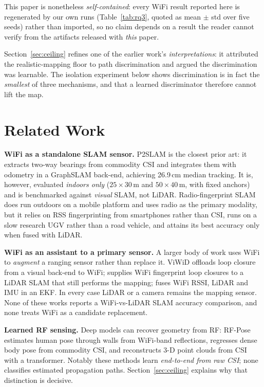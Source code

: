 \documentclass[journal]{IEEEtran}
\newcommand{\SI}[2]{#1\,#2}
\begin{document}
This paper is nonetheless \emph{self-contained}: every WiFi result reported here is
regenerated by our own runs (Table~\ref{tab:rq3}, quoted as mean $\pm$ std over five
seeds) rather than imported, so no claim depends on a result the reader cannot verify from
the artifacts released with \emph{this} paper.

Section~\ref{sec:ceiling} refines one of the earlier work's \emph{interpretations}: it
attributed the realistic-mapping floor to path discrimination and argued the discrimination
was learnable. The isolation experiment below shows discrimination is in fact the
\emph{smallest} of three mechanisms, and that a learned discriminator therefore cannot lift
the map.

\section{Related Work}\label{sec:related}

\textbf{WiFi as a standalone SLAM sensor.} P2SLAM \cite{arun2022p2slam} is the closest
prior art: it extracts two-way bearings from commodity CSI and integrates them with
odometry in a GraphSLAM back-end, achieving \SI{26.9}{cm} median tracking. It is,
however, evaluated \emph{indoors only} ($25\times30$\,m and $50\times40$\,m, with fixed
anchors) and is benchmarked against \emph{visual} SLAM, not LiDAR. Radio-fingerprint
SLAM \cite{liu2023radiofingerprintslam} does run outdoors on a mobile platform and uses
radio as the primary modality, but it relies on RSS fingerprinting from smartphones
rather than CSI, runs on a slow research UGV rather than a road vehicle, and attains its
best accuracy only when fused with LiDAR.

\textbf{WiFi as an assistant to a primary sensor.} A larger body of work uses WiFi to
\emph{augment} a ranging sensor rather than replace it. ViWiD \cite{arun2022viwid}
offloads loop closure from a visual back-end to WiFi; \cite{ismail2022wifilidarslam}
supplies WiFi fingerprint loop closures to a LiDAR SLAM that still performs the mapping;
\cite{li2025ekfwifilidarimu} fuses WiFi RSSI, LiDAR and IMU in an EKF. In every case
LiDAR or a camera remains the mapping sensor. None of these works reports a WiFi-vs-LiDAR
SLAM accuracy comparison, and none treats WiFi as a candidate replacement.

\textbf{Learned RF sensing.} Deep models can recover geometry from RF: RF-Pose
\cite{zhao2018rfpose} estimates human pose through walls from WiFi-band reflections,
\cite{geng2022denseposewifi} regresses dense body pose from commodity CSI, and
\cite{maatta2024csipointcloud} reconstructs 3-D point clouds from CSI with a transformer.
Notably these methods learn \emph{end-to-end from raw CSI}; none classifies estimated
propagation paths. Section~\ref{sec:ceiling} explains why that distinction is decisive.
\end{document}

